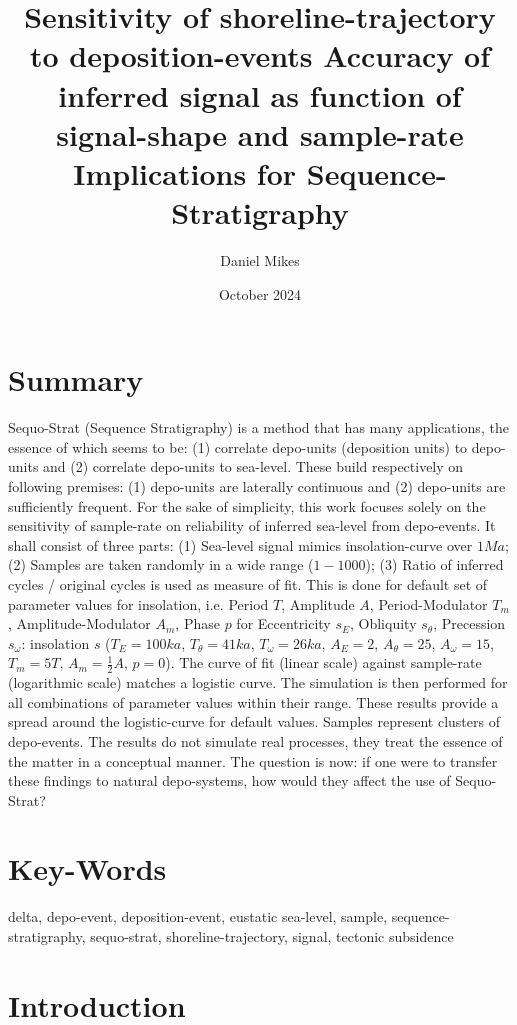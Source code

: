 \documentclass[12pt]{article}
\title{\huge{Sensitivity of shoreline-trajectory to deposition-events}
\Large{Accuracy of inferred signal as function of signal-shape and sample-rate\\}
\large{Implications for Sequence-Stratigraphy}}
\author{Daniel Mikes}
\date{October 2024}
\begin{document}
\maketitle

\section*{Summary}

Sequo-Strat (Sequence Stratigraphy) is a method that has many applications, the essence of which seems to be: (1) correlate depo-units (deposition units) to depo-units and (2) correlate depo-units to sea-level. These build respectively on following premises: (1) depo-units are laterally continuous and (2) depo-units are sufficiently frequent. For the sake of simplicity, this work focuses solely on the sensitivity of sample-rate on reliability of inferred sea-level from depo-events. It shall consist of three parts: (1) Sea-level signal mimics insolation-curve over $1Ma$; (2) Samples are taken randomly in a wide range ($1-1000$); (3) Ratio of inferred cycles / original cycles is used as measure of fit. This is done for default set of parameter values for insolation, i.e. Period $T$, Amplitude $A$, Period-Modulator $T_m$, Amplitude-Modulator $A_m$, Phase $p$ for Eccentricity $s_E$, Obliquity $s_\theta$, Precession $s_\omega$: insolation $s$ ($T_E=100ka$, $T_\theta=41ka$, $T_\omega=26ka$, $A_E=2$, $A_\theta=25$, $A_\omega=15$, $T_m=5T$, $A_m=\frac{1}{2}A$, $p=0$). The curve of fit (linear scale) against sample-rate (logarithmic scale) matches a logistic curve. The simulation is then performed for all combinations of parameter values within their range. These results provide a spread around the logistic-curve for default values. Samples represent clusters of depo-events. The results do not simulate real processes, they treat the essence of the matter in a conceptual manner. The question is now: if one were to transfer these findings to natural depo-systems, how would they affect the use of Sequo-Strat?

\section*{Key-Words}

delta, depo-event, deposition-event, eustatic sea-level, sample, sequence-stratigraphy, sequo-strat, shoreline-trajectory, signal, tectonic subsidence

\section*{Introduction}
\end{document}
